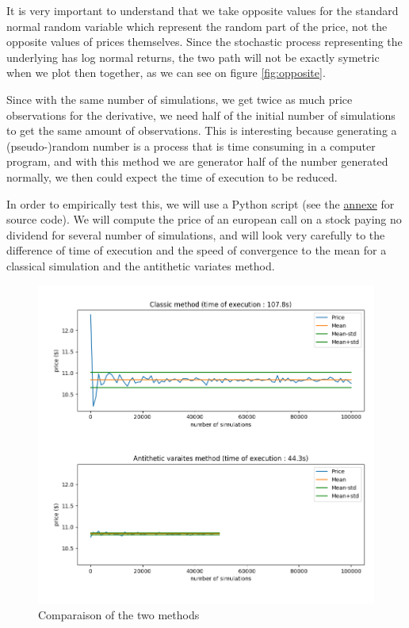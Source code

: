 \documentclass[hidelinks]{article}
\begin{document}
	It is very important to understand that we take opposite values for the standard normal random variable which represent the random part of the price, not the opposite values of prices themselves. Since the stochastic process representing the underlying has log normal returns, the two path will not be exactly symetric when we plot then together, as we can see on figure \ref{fig:opposite}.
	
	Since with the same number of simulations, we get twice as much price observations for the derivative, we need half of the initial number of simulations to get the same amount of observations. This is interesting because generating a (pseudo-)random number is a process that is time consuming in a computer program, and with this method we are generator half of the number generated normally, we then could expect the time of execution to be reduced.
	
	In order to empirically test this, we will use a Python script (see the \hyperref[sec:antithetic]{annexe} for source code). We will compute the price of an european call on a stock paying no dividend for several number of simulations, and will look very carefully to the difference of time of execution and the speed of convergence to the mean for a classical simulation and the antithetic variates method.
	
	\begin{figure}[!h]
				\centering
				\includegraphics[width=\linewidth]{antithetic.png}
				\caption{Comparaison of the two methods}
				\label{fig:antithetic}
				\end{figure}
				
\end{document}
